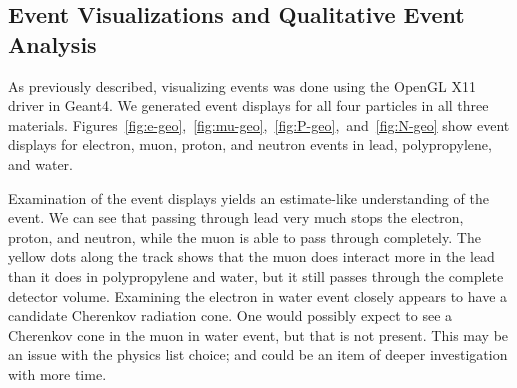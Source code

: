 \documentclass[aps,prd,twocolumn,nofootinbib]{revtex4-1}
\begin{document}
\subsection{Event Visualizations and Qualitative Event Analysis}

As previously described, visualizing events was done using the OpenGL X11 driver in Geant4. We generated event displays for all four particles in all three materials. Figures~\ref{fig:e-geo},~\ref{fig:mu-geo},~\ref{fig:P-geo},~and~\ref{fig:N-geo} show event displays for electron, muon, proton, and neutron events in lead, polypropylene, and water.

Examination of the event displays yields an estimate-like understanding of the event. We can see that passing through lead very much stops the electron, proton, and neutron, while the muon is able to pass through completely. The yellow dots along the track shows that the muon does interact more in the lead than it does in polypropylene and water, but it still passes through the complete detector volume. Examining the electron in water event closely appears to have a candidate Cherenkov radiation cone. One would possibly expect to see a Cherenkov cone in the muon in water event, but that is not present. This may be an issue with the physics list choice; and could be an item of deeper investigation with more time.
\end{document}
